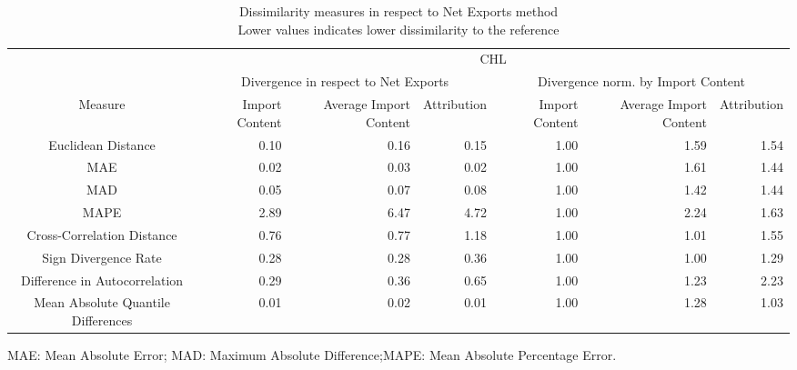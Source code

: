 \begin{table}[t]
\caption*{
{\large Dissimilarity measures in respect to Net Exports method} \\ 
{\small Lower values indicates lower dissimilarity to the reference}
} 
\fontsize{15.0pt}{18.0pt}\selectfont
\begin{tabular*}{\linewidth}{@{\extracolsep{\fill}}crrrrrr}
\toprule
 & \multicolumn{6}{c}{CHL} \\ 
\cmidrule(lr){2-7}
 & \multicolumn{3}{c}{Divergence in respect to Net Exports} & \multicolumn{3}{c}{Divergence norm. by Import Content} \\ 
\cmidrule(lr){2-4} \cmidrule(lr){5-7}
Measure & Import Content & Average Import Content & Attribution & Import Content & Average Import Content & Attribution \\ 
\midrule\addlinespace[2.5pt]
Euclidean Distance & 0.10 & 0.16 & 0.15 & 1.00 & 1.59 & 1.54 \\ 
MAE & 0.02 & 0.03 & 0.02 & 1.00 & 1.61 & 1.44 \\ 
MAD & 0.05 & 0.07 & 0.08 & 1.00 & 1.42 & 1.44 \\ 
MAPE & 2.89 & 6.47 & 4.72 & 1.00 & 2.24 & 1.63 \\ 
Cross-Correlation Distance & 0.76 & 0.77 & 1.18 & 1.00 & 1.01 & 1.55 \\ 
Sign Divergence Rate & 0.28 & 0.28 & 0.36 & 1.00 & 1.00 & 1.29 \\ 
Difference in Autocorrelation & 0.29 & 0.36 & 0.65 & 1.00 & 1.23 & 2.23 \\ 
Mean Absolute Quantile Differences & 0.01 & 0.02 & 0.01 & 1.00 & 1.28 & 1.03 \\ 
\bottomrule
\end{tabular*}
\begin{minipage}{\linewidth}
MAE: Mean Absolute Error; MAD: Maximum Absolute Difference;MAPE: Mean Absolute Percentage Error.\\
\end{minipage}
\end{table}

